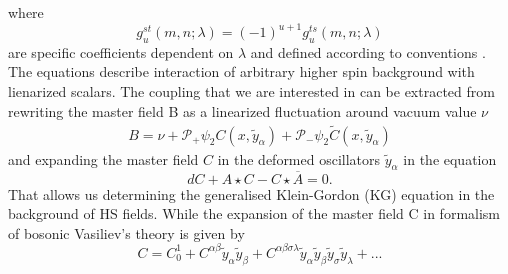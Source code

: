 \documentclass[prd,superscriptaddress,twocolumn,10pt]{revtex4}
\begin{document}
where 
\begin{equation}g_u^{st}(m,n;\lambda)=(-1)^{u+1}g_u^{ts}(m,n;\lambda)\end{equation}
are specific coefficients dependent on $\lambda$ and defined according to conventions .
The equations describe interaction of arbitrary higher spin background with lienarized scalars.
The coupling that we are interested in can be extracted from rewriting the master field B as a linearized fluctuation around vacuum value $\mathcal{\nu}$
\begin{align}
B=\mathcal{\nu}+\mathcal{P}_{+}\psi_2C(x,\tilde{y}_{\alpha})+\mathcal{P}_-\psi_2\tilde{C}(x,\tilde{y}_{\alpha})
\end{align}
and expanding the master field $C$ in the deformed oscillators $\tilde{y}_{\alpha}$ in the equation
\begin{equation}
dC+A\star C- C \star \overline{A}=0.
\end{equation}
 That allows us determining the generalised Klein-Gordon (KG) equation in the background of HS fields.
While the expansion of the master field C in formalism of bosonic Vasiliev's theory is given by
 \begin{equation}
 C=C_0^1+C^{\alpha\beta}\tilde{y}_{\alpha}\tilde{y}_{\beta}+C^{\alpha\beta\sigma\lambda}\tilde{y}_{\alpha}\tilde{y}_{\beta}\tilde{y}_{\sigma}\tilde{y}_{\lambda}+...
 \end{equation}
\end{document}
